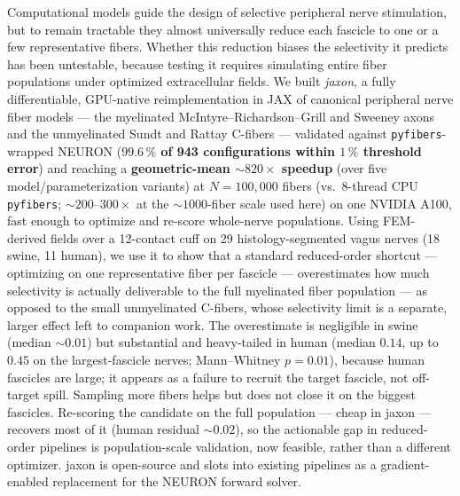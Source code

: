 Computational models guide the design of selective peripheral nerve
stimulation, but to remain tractable they almost universally reduce
each fascicle to one or a few representative fibers.  Whether this
reduction biases the selectivity it predicts has been untestable,
because testing it requires simulating entire fiber populations under
optimized extracellular fields.  We built \emph{jaxon}, a fully
differentiable, GPU-native reimplementation in JAX of canonical
peripheral nerve fiber models --- the myelinated
McIntyre--Richardson--Grill and Sweeney axons and the unmyelinated
Sundt and Rattay C-fibers --- validated against
\texttt{pyfibers}-wrapped NEURON (\textbf{$99.6\,\%$ of 943
configurations within $1\,\%$ threshold error}) and reaching a
\textbf{geometric-mean $\sim\!820\times$ speedup} (over five
model/parameterization variants) at $N = 100{,}000$ fibers (vs.\
8-thread CPU \texttt{pyfibers}; $\sim\!200$--$300\times$ at the
${\sim}1000$-fiber scale used here) on one NVIDIA A100, fast enough to
optimize and re-score whole-nerve populations.  Using FEM-derived fields over a 12-contact
cuff on 29 histology-segmented vagus nerves (18 swine, 11 human),
we use it to show that a standard reduced-order shortcut ---
optimizing on one representative fiber per fascicle --- overestimates
how much selectivity is actually deliverable to the full myelinated
fiber population --- as opposed to the small unmyelinated C-fibers,
whose selectivity limit is a separate, larger effect left to companion
work.  The
overestimate is negligible in swine (median ${\sim}0.01$) but substantial
and heavy-tailed in human (median $0.14$, up to $0.45$ on the
largest-fascicle nerves; Mann--Whitney $p = 0.01$), because human
fascicles are large; it appears as a failure to recruit the target
fascicle, not off-target spill.  Sampling more fibers helps but does
not close it on the biggest fascicles.  Re-scoring the candidate on the
full population --- cheap in jaxon --- recovers most of it (human
residual ${\sim}0.02$), so the actionable gap in reduced-order pipelines
is population-scale validation, now feasible, rather than a different
optimizer.  jaxon is open-source and slots into existing pipelines as
a gradient-enabled replacement for the NEURON forward solver.
